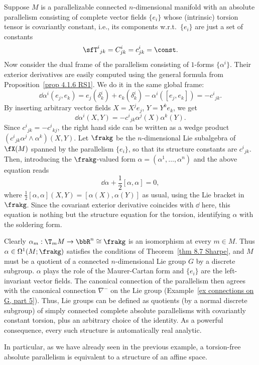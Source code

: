 \begin{example}
    Suppose $M$ is a parallelizable connected $n$-dimensional manifold with an absolute parallelism consisting of complete vector fields $\{e_i\}$ whose (intrinsic) torsion tensor is covariantly constant, i.e., its components w.r.t.\ $\{e_i\}$ are just a set of constants
    \[\sfT^i{}_{jk}=C^i_{jk}=c^i_{jk}=\const.\]
    Now consider the dual frame of the parallelism consisting of $1$-forms  $\{\alpha^i\}$. Their exterior derivatives are easily computed using the general formula from Proposition~\ref{prop 4.1.6 RS1}. We do it in the same global frame:
    \[\dd\alpha^i(e_j,e_k)=e_j(\delta^i_k)+e_k(\delta^i_k)-\alpha^i([e_j,e_k])=-c^i{}_{jk}.\]
    By inserting arbitrary vector fields $X=X^j e_j$, $Y=Y^k e_k$, we get 
    \[\dd\alpha^i(X,Y)=-c^i{}_{jk}\alpha^j(X)\alpha^k(Y).\]
    Since $c^i{}_{jk}=-c^i{}_{kj}$, the right hand side can be written as a wedge product $(c^i{}_{jk}\alpha^j\wedge\alpha^k)(X,Y)$. Let $\frakg$ be the $n$-dimensional Lie subalgebra of $\fX(M)$ spanned by the parallelism $\{e_i\}$, so that its structure constants are $c^i{}_{jk}$. Then, introducing the $\frakg$-valued form $\alpha=(\alpha^1,\ldots,\alpha^n)$ and the above equation reads 
    \[\dd\alpha +\frac12[\alpha,\alpha]=0,\]
    where $\frac12[\alpha,\alpha](X,Y)=[\alpha(X),\alpha(Y)]$ as usual, using the Lie bracket in $\frakg$. Since the covariant exterior derivative coincides with $\dd$ here, this equation is nothing but the structure equation for the torsion, identifying $\alpha$ with the soldering form.

    Clearly $\alpha_m:\T_mM\to \bbR^n\cong\frakg$ is an isomorphism at every $m\in M$. Thus $\alpha\in\Omega^1(M;\frakg)$ satisfies the conditions of Theorem~\ref{thm 8.7 Sharpe}, and $M$ must be a quotient of a connected $n$-dimensional Lie group $G$ by a discrete subgroup. $\alpha$ plays the role of the Maurer-Cartan form and $\{e_i\}$ are the left-invariant vector fields. The canonical connection of the parallelism then agrees with the canonical connection $\nabla^-$ on the Lie group (Example~\ref{ex connections on G, part 5}). Thus, Lie groups can be defined as quotients (by a normal discrete subgroup) of simply connected complete absolute parallelisms with covariantly constant torsion, plus an arbitrary choice of the identity. As a powerful consequence, every such structure is automatically real analytic.

    In particular, as we have already seen in the previous example, a torsion-free absolute parallelism is equivalent to a structure of an affine space.
\end{example}

